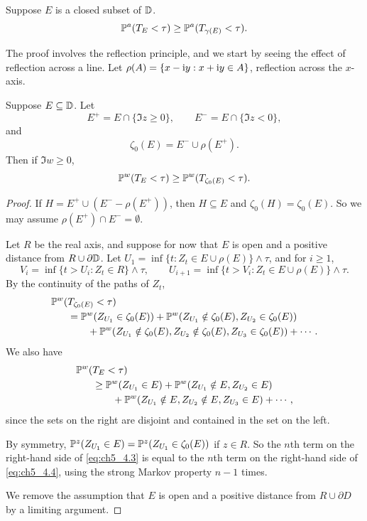 \begin{theorem}\label{thm:ch5_4.1}
Suppose $E$ is a closed subset of $\D$.
\[
    \P^a(T_E < \tau) \geq \P^a(T_{\gamma(E)} < \tau).
\]
\end{theorem}

The proof involves the reflection principle, and we start by seeing the effect of reflection across a line. Let $\rho(A) = \{x - \im y : x + \im y \in A\}$, reflection across the $x$-axis.

\begin{lemma}\label{lem:ch5_4.2}
Suppose $E \subseteq \D$. Let
\[E^+ = E \cap \{\Im z \geq 0\}, \qquad E^- = E \cap \{\Im z < 0\},\]
and
\[
    \zeta_0(E) = E^- \cup \rho(E^+).
\]
Then if $\Im w \geq 0$,
\[
    \P^w(T_E < \tau) \geq \P^w(T_{\zeta_0(E)} < \tau).
\]
\end{lemma}


\begin{proof}
If $H = E^+ \cup (E^- - \rho(E^+))$, then $H \subseteq E$ and $\zeta_0(H) = \zeta_0(E)$. So we may assume $\rho(E^+) \cap E^- = \emptyset$.

Let $R$ be the real axis, and suppose for now that $E$ is open and a positive distance from $R \cup \partial\D$. Let $U_1 = \inf\{t : Z_t \in E \cup \rho(E)\} \wedge \tau$, and for $i \geq 1$,
\[
    V_i = \inf\{t > U_i : Z_t \in R\} \wedge \tau, \qquad U_{i+1} = \inf\{t > V_i : Z_t \in E \cup \rho(E)\} \wedge \tau.
\]
By the continuity of the paths of $Z_t$,
\begin{align}\label{eq:ch5_4.3}
\P^w(&T_{\zeta_0(E)} < \tau) \\
    &= \P^w(Z_{U_1} \in \zeta_0(E)) + \P^w(Z_{U_1} \notin \zeta_0(E), Z_{U_2} \in \zeta_0(E)) \notag \\
    &\qquad+ \P^w(Z_{U_1} \notin \zeta_0(E), Z_{U_2} \notin \zeta_0(E), Z_{U_3} \in \zeta_0(E)) + \cdots. \notag
\end{align}
We also have
\begin{align}\label{eq:ch5_4.4}
    \P^w(&T_E < \tau) \\
    &\geq \P^w(Z_{U_1} \in E) + \P^w(Z_{U_1} \notin E, Z_{U_2} \in E) \notag \\
    &\qquad+ \P^w(Z_{U_1} \notin E, Z_{U_2} \notin E, Z_{U_3} \in E) + \cdots, \notag
\end{align}
since the sets on the right are disjoint and contained in the set on the left.


By symmetry, $\P^z(Z_{U_1} \in E) = \P^z(Z_{U_1} \in \zeta_0(E))$ if $z \in R$. So the $n$th term on the right-hand side of \eqref{eq:ch5_4.3} is equal to the $n$th term on the right-hand side of \eqref{eq:ch5_4.4}, using the strong Markov property $n-1$ times.

We remove the assumption that $E$ is open and a positive distance from $R \cup \partial D$ by a limiting argument.
\end{proof}

